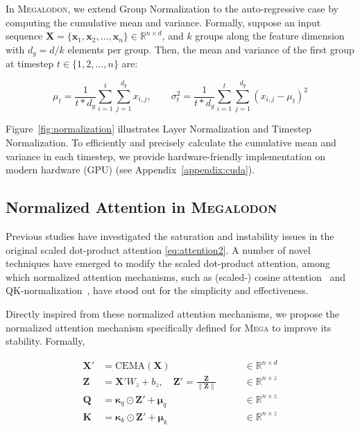 In \textsc{Megalodon}, we extend Group Normalization to the auto-regressive case by computing the cumulative mean and variance. Formally, suppose an input sequence $\boldsymbol{X} = \{\mathbf{x}_1, \mathbf{x}_2, \ldots, \mathbf{x}_n\} \in \mathbb{R}^{n\times d}$, and $k$ groups along the feature dimension with $d_g = d/k$ elements per group. Then, the mean and variance of the first group at timestep $t \in \{1, 2, \ldots, n \}$ are:

\begin{equation}
\mu_t = \frac{1}{t * d_g}\sum\limits_{i = 1}^{t}\sum\limits_{j=1}^{d_g} x_{i,j}, \qquad \sigma^2_t = \frac{1}{t * d_g}\sum\limits_{i = 1}^{t}\sum\limits_{j=1}^{d_g} (x_{i,j} - \mu_t)^2
\end{equation}

Figure~\ref{fig:normalization} illustrates Layer Normalization and Timestep Normalization. To efficiently and precisely calculate the cumulative mean and variance in each timestep, we provide hardware-friendly implementation on modern hardware (GPU) (see Appendix~\ref{appendix:cuda}). 

\subsection{Normalized Attention in \textsc{Megalodon}}
\label{subsec:norm-attn}

Previous studies have investigated the saturation and instability issues in the original scaled dot-product attention \eqref{eq:attention2}. A number of novel techniques have emerged to modify the scaled dot-product attention, among which normalized attention mechanisms, such as (scaled-) cosine attention~\citep{luo2018cosine,liu2022swin} and QK-normalization~\citep{henry2020query}, have stood out for the simplicity and effectiveness. 

Directly inspired from these normalized attention mechanisms, we propose the normalized attention mechanism specifically defined for \textsc{Mega} to improve its stability. Formally,

\begin{align}
\boldsymbol{X}' & = \mathrm{CEMA}(\boldsymbol{X}) \qquad & \qquad \in \mathbb{R}^{n\times d} \\
\boldsymbol{Z} & = \boldsymbol{X}' W_z + b_z, \quad \boldsymbol{Z}' = \frac{\boldsymbol{Z}}{\| \boldsymbol{Z}\|} & \qquad \in \mathbb{R}^{n\times z} \\
\boldsymbol{Q} & = \boldsymbol{\kappa}_q \odot \boldsymbol{Z}' + \boldsymbol{\mu}_q \qquad & \qquad \in \mathbb{R}^{n\times z} \label{eq:q} \\
\boldsymbol{K} & = \boldsymbol{\kappa}_k \odot \boldsymbol{Z}' + \boldsymbol{\mu}_k \qquad & \qquad \in \mathbb{R}^{n\times z} \label{eq:k}
\end{align}

